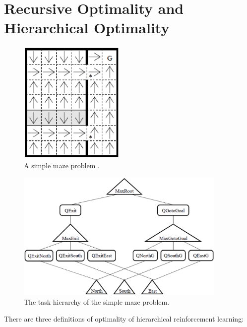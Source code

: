 \section{Recursive Optimality and Hierarchical Optimality}
\label{se:ROHO}
\begin{figure}[t]
\begin{center}
    \includegraphics[width=2in] {./figures/Maze.eps}
\end{center}
\caption{A simple maze problem \cite{MaxQJ}.}
\label{fig:Maze}
\end{figure}
\begin{figure}[t]
\begin{center}
    \includegraphics[width=4in] {./figures/MazeH.eps}
\end{center}
\caption{The task hierarchy of the simple maze problem.}
\label{fig:MazeH}
\end{figure}

There are three definitions of optimality of hierarchical reinforcement learning:

